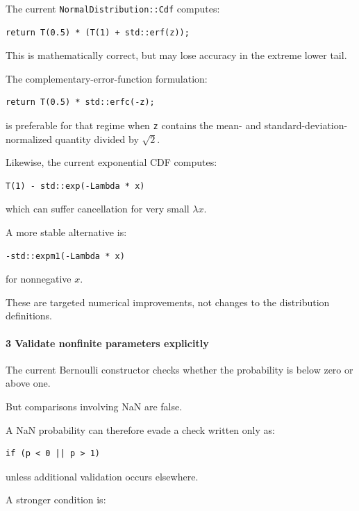 The current \texttt{NormalDistribution::Cdf} computes:

\begin{verbatim}
return T(0.5) * (T(1) + std::erf(z));
\end{verbatim}

This is mathematically correct, but may lose accuracy in the extreme lower tail.

The complementary-error-function formulation:

\begin{verbatim}
return T(0.5) * std::erfc(-z);
\end{verbatim}

is preferable for that regime when \texttt{z} contains the mean- and standard-deviation-normalized quantity divided by \(\sqrt2\).

Likewise, the current exponential CDF computes:

\begin{verbatim}
T(1) - std::exp(-Lambda * x)
\end{verbatim}

which can suffer cancellation for very small \(\lambda x\).

A more stable alternative is:

\begin{verbatim}
-std::expm1(-Lambda * x)
\end{verbatim}

for nonnegative \(x\).

These are targeted numerical improvements, not changes to the distribution definitions.

\paragraph{3 Validate nonfinite parameters explicitly}\label{02-foundations-ii-ch039-validate-nonfinite-parameters-explicitly}

The current Bernoulli constructor checks whether the probability is below zero or above one.

But comparisons involving NaN are false.

A NaN probability can therefore evade a check written only as:

\begin{verbatim}
if (p < 0 || p > 1)
\end{verbatim}

unless additional validation occurs elsewhere.

A stronger condition is:

